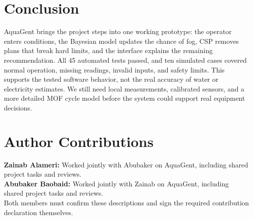 \documentclass[11pt,a4paper]{article}
\begin{document}
\section{Conclusion}
AquaGent brings the project steps into one working prototype: the operator enters conditions, the Bayesian model updates the chance of fog, CSP removes plans that break hard limits, and the interface explains the remaining recommendation. All 45 automated tests passed, and ten simulated cases covered normal operation, missing readings, invalid inputs, and safety limits. This supports the tested software behavior, not the real accuracy of water or electricity estimates. We still need local measurements, calibrated sensors, and a more detailed MOF cycle model before the system could support real equipment decisions.

\section*{Author Contributions}
\noindent\textbf{Zainab Alameri:} Worked jointly with Abubaker on AquaGent, including shared project tasks and reviews.\\
\textbf{Abubaker Baobaid:} Worked jointly with Zainab on AquaGent, including shared project tasks and reviews.\\
Both members must confirm these descriptions and sign the required contribution declaration themselves.
\end{document}
